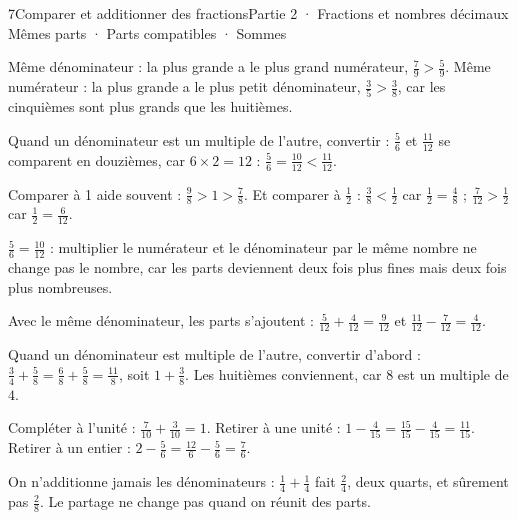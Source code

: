 \begin{ouverture}[calcul]{7}{Comparer et additionner des fractions}{Partie 2 · Fractions et nombres décimaux}
{Mêmes parts · Parts compatibles · Sommes}
\end{ouverture}
\pagestyle{otMain}\essentiel\fontsize{11}{15}\selectfont
{}\label{cours-7-1}
\begin{propriete}Même dénominateur : la plus grande a le plus grand numérateur, $\frac79>\frac59$. Même numérateur : la plus grande a le plus petit dénominateur, $\frac35>\frac38$, car les cinquièmes sont plus grands que les huitièmes.\end{propriete}
\begin{savoirfaire}Quand un dénominateur est un multiple de l’autre, convertir : $\frac56$ et $\frac{11}{12}$ se comparent en douzièmes, car $6\times2=12$ : $\frac56=\frac{10}{12}<\frac{11}{12}$.\end{savoirfaire}
\begin{exemple}Comparer à 1 aide souvent : $\frac98>1>\frac78$. Et comparer à $\frac12$ : $\frac38<\frac12$ car $\frac12=\frac48$ ; $\frac7{12}>\frac12$ car $\frac12=\frac6{12}$.\end{exemple}
\begin{attention}$\frac56=\frac{10}{12}$ : multiplier le numérateur et le dénominateur par le même nombre ne change pas le nombre, car les parts deviennent deux fois plus fines mais deux fois plus nombreuses.\end{attention}
\clearpage
{}\label{cours-7-2}
\begin{propriete}Avec le même dénominateur, les parts s’ajoutent : $\frac5{12}+\frac4{12}=\frac9{12}$ et $\frac{11}{12}-\frac7{12}=\frac4{12}$.\end{propriete}
\begin{savoirfaire}Quand un dénominateur est multiple de l’autre, convertir d’abord : $\frac34+\frac58=\frac68+\frac58=\frac{11}8$, soit $1+\frac38$. Les huitièmes conviennent, car $8$ est un multiple de $4$.\end{savoirfaire}
\begin{exemple}Compléter à l’unité : $\frac7{10}+\frac3{10}=1$. Retirer à une unité : $1-\frac4{15}=\frac{15}{15}-\frac4{15}=\frac{11}{15}$. Retirer à un entier : $2-\frac56=\frac{12}6-\frac56=\frac76$.\end{exemple}
\begin{attention}On n’additionne jamais les dénominateurs : $\frac14+\frac14$ fait $\frac24$, deux quarts, et sûrement pas $\frac28$. Le partage ne change pas quand on réunit des parts.\end{attention}

